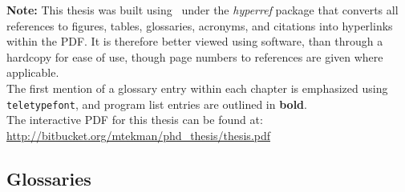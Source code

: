 \documentclass[11pt]{report} %
\begin{document}
\begin{spacing}{1.1}





{\noindent \textbf{Note:} This thesis was built using \LaTeXe\  under the \textit{hyperref} package that converts all references to figures, tables, glossaries, acronyms, and citations into hyperlinks within the PDF. It is therefore better viewed using software, than through a hardcopy for ease of use, though page numbers to references are given where applicable.\\

\noindent
The first mention of a glossary entry within each chapter is emphasized using \texttt{teletypefont}, and program list entries are outlined in \textbf{bold}.\\

\noindent
The interactive PDF for this thesis can be found at:\\
\url{http://bitbucket.org/mtekman/phd_thesis/thesis.pdf}

}


	\begin{spacing}{1.2}

	\end{spacing}

\pagebreak
	\begin{spacing}{1.2}
	\tableofcontents
	\end{spacing}
\end{spacing}

\endgroup





\pagebreak







\begin{spacing}{1}

\addtocounter{chapter}{1}
\pagebreak
{}





\appendix

\pagebreak
\chapter{Glossaries}
\printglossary[type=bio,style=long]
\pagebreak
\printglossary[type=comp,style=long]

\end{spacing}


\end{document}
